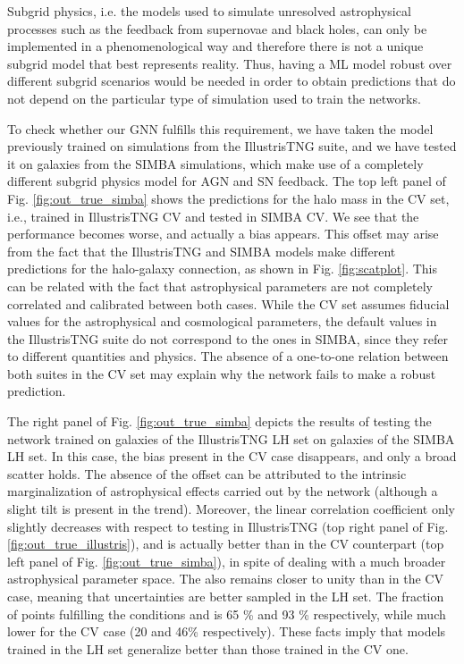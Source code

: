 \documentclass[twocolumn]{aastex631}
\begin{document}
Subgrid physics, i.e. the models used to simulate unresolved astrophysical processes such as the feedback from supernovae and black holes, can only be implemented in a phenomenological way and therefore there is not a unique subgrid model that best represents reality. Thus, having a ML model robust over different subgrid scenarios would be needed in order to obtain predictions that do not depend on the particular type of simulation used to train the networks. 

To check whether our GNN fulfills this requirement, we have taken the model previously trained on simulations from the IllustrisTNG suite, and we have tested it on galaxies from the SIMBA simulations, which make use of a completely different subgrid physics model for AGN and SN feedback. The top left panel of Fig. \ref{fig:out_true_simba} shows the predictions for the halo mass in the CV set, i.e., trained in IllustrisTNG CV and tested in SIMBA CV. We see that the performance becomes worse, and actually a bias appears. This offset may arise from the fact that the IllustrisTNG and SIMBA models make different predictions for the halo-galaxy connection, as shown in Fig. \ref{fig:scatplot}. This can be related with the fact that astrophysical parameters are not completely correlated and calibrated between both cases. While the CV set assumes fiducial values for the astrophysical and cosmological parameters, the default values in the IllustrisTNG suite do not correspond to the ones in SIMBA, since they refer to different quantities and physics. The absence of a one-to-one relation between both suites in the CV set may explain why the network fails to make a robust prediction.



The right panel of Fig. \ref{fig:out_true_simba} depicts the results of testing the network trained on galaxies of the IllustrisTNG LH set on galaxies of the SIMBA LH set. In this case, the bias present in the CV case disappears, and only a broad scatter holds. The absence of the offset can be attributed to the intrinsic marginalization of astrophysical effects carried out by the network (although a slight tilt is present in the trend). Moreover, the linear correlation coefficient only slightly decreases with respect to testing in IllustrisTNG (top right panel of Fig. \ref{fig:out_true_illustris}), and is actually better than in the CV counterpart (top left panel of Fig. \ref{fig:out_true_simba}), in spite of dealing with a much broader astrophysical parameter space. The  also remains closer to unity than in the CV case, meaning that uncertainties are better sampled in the LH set. The fraction of points fulfilling the conditions  and  is 65 \% and 93 \% respectively, while much lower for the CV case (20 and 46\% respectively). These facts imply that models trained in the LH set generalize better than those trained in the CV one. 
\end{document}
